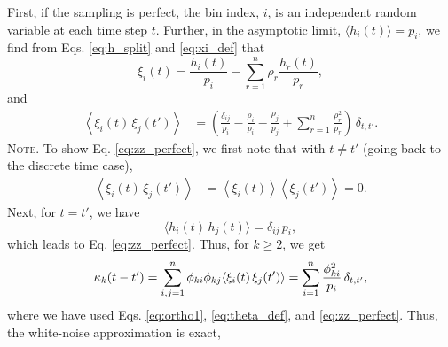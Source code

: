 \documentclass[reprint, superscriptaddress, floatfix]{revtex4-1}
\newcommand{\note}[1]{{\color{DarkGreen}\footnotesize \textsc{Note.} #1}}
\begin{document}
First, if the sampling is perfect,
%
%
the bin index, $i$, is an independent random variable
at each time step $t$.
%
Further, in the asymptotic limit,
$\langle h_i(t) \rangle = p_i$,
we find from Eqs. \eqref{eq:h_split} and \eqref{eq:xi_def} that
\begin{equation*}
  \xi_i(t)
  =
  \frac{ h_i(t) } { p_i }
  -
  \sum_{ r = 1 }^n
    \rho_r \frac{ h_r(t) } { p_r }
  ,
\end{equation*}
%
and
%
\begin{align}
  \left\langle
    \xi_i(t) \, \xi_j(t')
  \right\rangle
  &=
  \left(
    \frac{ \delta_{ij} } { p_i }
    -
    \frac{ \rho_i } { p_i }
    -
    \frac{ \rho_j } { p_j }
    +
    \sum_{r = 1}^n
    \frac{ \rho_r^2 } { p_r }
  \right) \,
  \delta_{t, t'}
  .
\label{eq:zz_perfect}
\end{align}
%
%
\note{To show Eq. \eqref{eq:zz_perfect}, we first note that
  with $t \ne t'$ (going back to the discrete time case),
  $$
  \begin{aligned}
  \left\langle
    \xi_i(t) \, \xi_j(t')
  \right\rangle
  &=
  \left\langle
    \xi_i(t)
  \right\rangle
  \left\langle
    \xi_j(t')
  \right\rangle
  =
  0.
  \end{aligned}
  $$
  Next, for $t = t'$, we have
  $$
  \langle
    h_i(t) \, h_j(t)
  \rangle
  = \delta_{ij} \, p_i
  ,
  $$
  which leads to Eq. \eqref{eq:zz_perfect}.
}
%
Thus,
for $k \ge 2$, we get
%
\begin{equation}
  \kappa_k(t - t')
  =
  \sum_{i,j = 1}^n
  \phi_{ki} \phi_{kj}
  \langle \xi_i(t) \, \xi_j(t') \rangle
  =
  \sum_{i = 1}^n \frac{ \phi_{ki}^2 } { p_i }
  \, \delta_{t, t'},
\notag
\end{equation}
%
where we have used
Eqs. \eqref{eq:ortho1},
\eqref{eq:theta_def},
and
\eqref{eq:zz_perfect}.
%
Thus, the white-noise approximation is exact,
\end{document}
